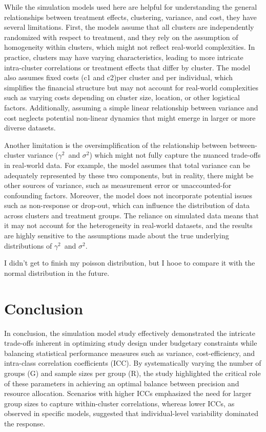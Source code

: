 \documentclass[
]{article}
\begin{document}
While the simulation models used here are helpful for understanding the
general relationships between treatment effects, clustering, variance,
and cost, they have several limitations. First, the models assume that
all clusters are independently randomized with respect to treatment, and
they rely on the assumption of homogeneity within clusters, which might
not reflect real-world complexities. In practice, clusters may have
varying characteristics, leading to more intricate intra-cluster
correlations or treatment effects that differ by cluster. The model also
assumes fixed costs (c1 and c2)per cluster and per individual, which
simplifies the financial structure but may not account for real-world
complexities such as varying costs depending on cluster size, location,
or other logistical factors. Additionally, assuming a simple linear
relationship between variance and cost neglects potential non-linear
dynamics that might emerge in larger or more diverse datasets.

Another limitation is the oversimplification of the relationship between
between-cluster variance (\(\gamma^2\)~and \(\sigma^2\)) which might not
fully capture the nuanced trade-offs in real-world data. For example,
the model assumes that total variance can be adequately represented by
these two components, but in reality, there might be other sources of
variance, such as measurement error or unaccounted-for confounding
factors. Moreover, the model does not incorporate potential issues such
as non-response or drop-out, which can influence the distribution of
data across clusters and treatment groups. The reliance on simulated
data means that it may not account for the heterogeneity in real-world
datasets, and the results are highly sensitive to the assumptions made
about the true underlying distributions of \(\gamma^2\)~and
\(\sigma^2\).

I didn't get to finish my poisson distribution, but I hooe to compare it
with the normal distribution in the future.

\hypertarget{conclusion}{%
\section{Conclusion}\label{conclusion}}

In conclusion, the simulation model study effectively demonstrated the
intricate trade-offs inherent in optimizing study design under budgetary
constraints while balancing statistical performance measures such as
variance, cost-efficiency, and intra-class correlation coefficients
(ICC). By systematically varying the number of groups (G) and sample
sizes per group (R), the study highlighted the critical role of these
parameters in achieving an optimal balance between precision and
resource allocation. Scenarios with higher ICCs emphasized the need for
larger group sizes to capture within-cluster correlations, whereas lower
ICCs, as observed in specific models, suggested that individual-level
variability dominated the response.
\end{document}
